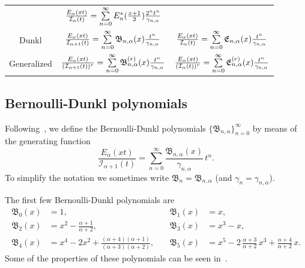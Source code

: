 \documentclass[a4paper]{amsart}
\newcommand{\I}{\mathcal{I}}
\newcommand{\Ea}{E_{\alpha}}
\newcommand{\cc}{\gamma}
\newcommand{\B}{\mathfrak{B}}
\newcommand{\E}{\mathfrak{E}}
\theoremstyle{plain}
\theoremstyle{definition}
\theoremstyle{remark}
\numberwithin{equation}{section}
\begin{document}
\begin{table}[!tb]
\begin{tabular}{ccc}
& $\frac{\Ea(xt)}{\I_{\alpha}(t)}
= \suml_{n=0}^{\infty} E_{n}^{*}(\frac{x+1}{2}) \frac{2^n t^n}{\cc_{n,\alpha}}$
\\[9pt]
Dunkl %
& $\frac{\Ea(xt)}{\I_{\alpha+1}(t)} 
= \suml_{n=0}^{\infty} \B_{n,\alpha}(x) \frac{t^n}{\cc_{n,\alpha}}$
& $\frac{\Ea(xt)}{\I_{\alpha}(t)}
= \suml_{n=0}^{\infty} \E_{n,\alpha}(x) \frac{t^n}{\cc_{n,\alpha}}$
\\[9pt]
Generalized %
& $\frac{\Ea(xt)}{(\I_{\alpha+1}(t))^r} 
= \suml_{n=0}^{\infty} \B_{n,\alpha}^{(r)}(x) \frac{t^n}{\cc_{n,\alpha}}$
& $\frac{\Ea(xt)}{(\I_{\alpha}(t))^r}
= \suml_{n=0}^{\infty} \E_{n,\alpha}^{(r)}(x) \frac{t^n}{\cc_{n,\alpha}}$
\\[9pt]
\hline
\end{tabular}%
\hspace*{-1cm}
\label{tab:scheme}
\end{table}


\subsection{Bernoulli-Dunkl polynomials}

Following~\cite{CDPV}, we define the Bernoulli-Dunkl polynomials $\{\B_{n,\alpha}\}_{n=0}^{\infty}$ by means of the generating function
\begin{equation}
\label{eq:defbd}
  \frac{\Ea(xt)}{\I_{\alpha+1}(t)}
  = \sum_{n=0}^\infty \frac{\B_{n,\alpha}(x)}{\cc_{n,\alpha}}\,t^n.
\end{equation}
To simplify the notation we sometimes write $\B_n=\B_{n,\alpha}$ (and $\cc_n=\cc_{n,\alpha}$).

The first few Bernoulli-Dunkl polynomials are
\begin{align*}
  \B_0(x) &= 1, \quad & \B_1(x) &= x, \\
  \B_2(x) &= x^2 - \frac{\alpha+1}{\alpha+2},\quad &
  \B_3(x) &= x^3 - x,\\
  \B_4(x) &= x^4 - 2x^2 + \frac{(\alpha+4)(\alpha+1)}{(\alpha+3)(\alpha+2)},\quad &
  \B_5(x) &= x^5 - 2\,\frac{\alpha+3}{\alpha+2}\,x^3 + \frac{\alpha+4}{\alpha+2}\,x.
\end{align*}
Some of the properties of these polynomials can be seen in~\cite{CDPV}.
\end{document}
